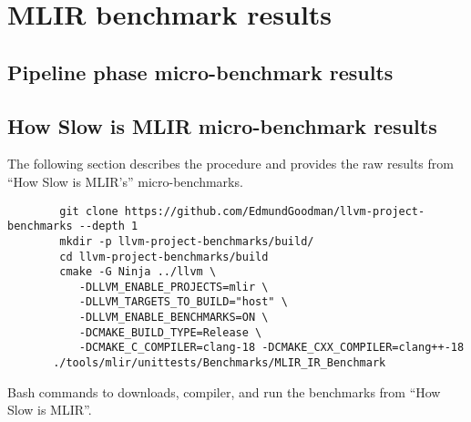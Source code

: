 \chapter{MLIR benchmark results}
\label{chap:mlir-benchmark-results}

\section{Pipeline phase micro-benchmark results}

\section{How Slow is MLIR micro-benchmark results}

The following section describes the procedure and provides the raw results from ``How Slow is MLIR's'' micro-benchmarks.

\vspace{2em}

\begin{code}
    \begin{verbatim}
        git clone https://github.com/EdmundGoodman/llvm-project-benchmarks --depth 1
        mkdir -p llvm-project-benchmarks/build/
        cd llvm-project-benchmarks/build
        cmake -G Ninja ../llvm \
           -DLLVM_ENABLE_PROJECTS=mlir \
           -DLLVM_TARGETS_TO_BUILD="host" \
           -DLLVM_ENABLE_BENCHMARKS=ON \
           -DCMAKE_BUILD_TYPE=Release \
           -DCMAKE_C_COMPILER=clang-18 -DCMAKE_CXX_COMPILER=clang++-18
       ./tools/mlir/unittests/Benchmarks/MLIR_IR_Benchmark
    \end{verbatim}
    \caption{Bash commands to downloads, compiler, and run the benchmarks from ``How Slow is MLIR''.}
    \label{listing:bash-xdsl-ubench-run}
\end{code}

\vspace{2em}

